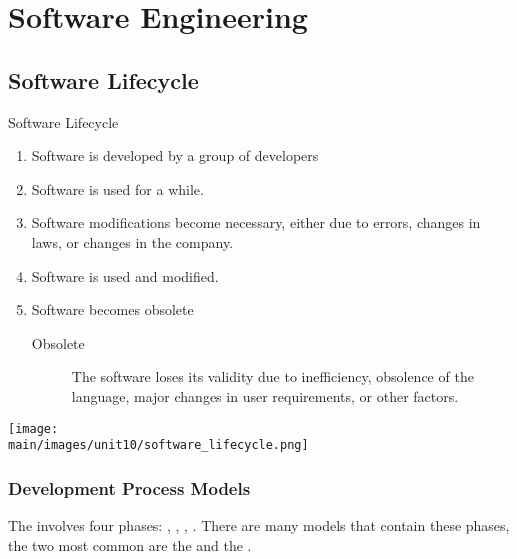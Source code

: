 \documentclass[\main/notes.tex]{subfiles}
\begin{document}
	\setcounter{chapter}{9}
	\chapter{Software Engineering}
		\section{Software Lifecycle}
			\begin{definition}{Software Lifecycle}
				\begin{enumerate}
					\item Software is developed by a group of developers
					\item Software is used for a while.
					\item Software modifications become necessary, either due to errors, changes in laws, or changes in the company.
					\item Software is used and modified.
					\item Software becomes obsolete
						\begin{indentparagraph}
							\begin{description}
								\item[Obsolete] The software loses its validity due to inefficiency, obsolence of the language, major changes in user requirements, or other factors.
							\end{description}
						\end{indentparagraph}
				\end{enumerate}
				\begin{center}
					\texttt{[image: \\main/images/unit10/software\_lifecycle.png]}
				\end{center}
			\end{definition}
			\subsection{Development Process Models}
				The  involves four phases: , , , . There are many models that contain these phases, the two most common are the  and the .
\end{document}

